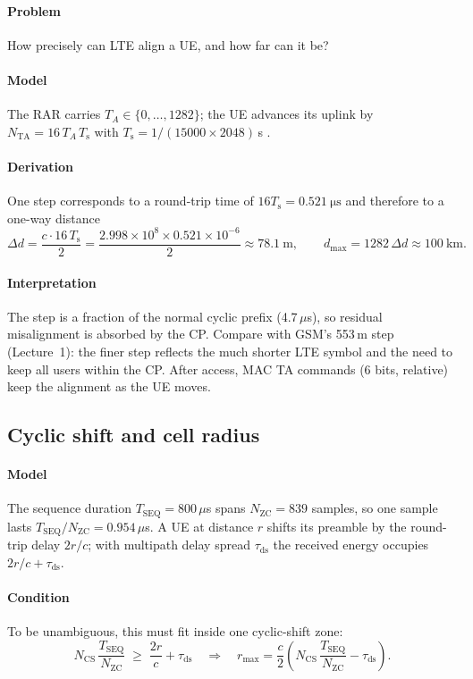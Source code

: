 \documentclass[11pt,a4paper]{article}
\begin{document}
\paragraph{Problem} How precisely can LTE align a UE, and how far can it be?
\paragraph{Model} The RAR carries $T_A\in\{0,\dots,1282\}$; the UE advances its uplink by
$N_{\mathrm{TA}} = 16\,T_A\,T_\mathrm{s}$ with $T_\mathrm{s} = 1/(15000\times2048)$\,s \cite{ts36213}.
\paragraph{Derivation} One step corresponds to a round-trip time of $16T_\mathrm{s} = \qty{0.521}{\micro\second}$
and therefore to a one-way distance
\begin{equation}\label{eq:tastep}
  \Delta d = \frac{c \cdot 16\,T_\mathrm{s}}{2} = \frac{2.998\times10^8\times0.521\times10^{-6}}{2} \approx \qty{78.1}{\metre},
  \qquad d_{\max} = 1282\,\Delta d \approx \qty{100}{\kilo\metre}.
\end{equation}
\paragraph{Interpretation} The step is a fraction of the normal cyclic prefix (4.7\,$\mu$s), so
residual misalignment is absorbed by the CP. Compare with GSM's 553\,m step (Lecture~1): the finer
step reflects the much shorter LTE symbol and the need to keep all users within the CP. After access,
MAC TA commands (6 bits, relative) keep the alignment as the UE moves.

\subsection{Cyclic shift and cell radius}\label{sec:ncs}
\paragraph{Model} The sequence duration $T_{\mathrm{SEQ}} = 800\,\mu$s spans $N_{\mathrm{ZC}} = 839$ samples,
so one sample lasts $T_{\mathrm{SEQ}}/N_{\mathrm{ZC}} = 0.954\,\mu$s. A UE at distance $r$ shifts its preamble
by the round-trip delay $2r/c$; with multipath delay spread $\tau_{\mathrm{ds}}$ the received energy occupies
$2r/c + \tau_{\mathrm{ds}}$.
\paragraph{Condition} To be unambiguous, this must fit inside one cyclic-shift zone:
\begin{equation}\label{eq:ncs}
  N_{\mathrm{CS}}\,\frac{T_{\mathrm{SEQ}}}{N_{\mathrm{ZC}}} \;\ge\; \frac{2r}{c} + \tau_{\mathrm{ds}}
  \quad\Longrightarrow\quad
  r_{\max} = \frac{c}{2}\left(N_{\mathrm{CS}}\,\frac{T_{\mathrm{SEQ}}}{N_{\mathrm{ZC}}} - \tau_{\mathrm{ds}}\right).
\end{equation}
\end{document}
